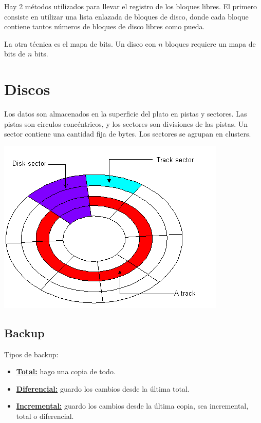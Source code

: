 Hay 2 métodos utilizados para llevar el registro de los bloques libres. El primero consiste en utilizar una lista enlazada de bloques de disco, donde cada bloque contiene tantos números de bloques de disco libres como pueda.

La otra técnica es el mapa de bits. Un disco con $n$ bloques requiere un mapa de bits de $n$ bits.

\newpage

\section{Discos}

Los datos son almacenados en la superficie del plato en pistas y sectores. Las pistas son circulos concéntricos, y los sectores son divisiones de las pistas. Un sector contiene una cantidad fija de bytes. Los sectores se agrupan en clusters.

\includegraphics[scale=1]{imagenes/disco.png}


\subsection{Backup}

Tipos de backup:

\begin{itemize}
\item \underline{\textbf{Total:}} hago una copia de todo.
\item \underline{\textbf{Diferencial:}} guardo los cambios desde la última total.
\item \underline{\textbf{Incremental:}} guardo los cambios desde la última copia, sea incremental, total o diferencial.
\end{itemize}

